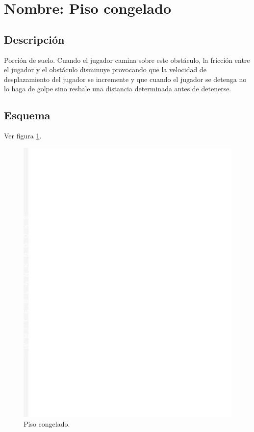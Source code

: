 	\section{Nombre: Piso congelado}\label{obs.pisoC}
	\subsection{Descripción}
	Porción de suelo. Cuando el jugador camina sobre este obstáculo, la fricción entre el jugador y el obstáculo disminuye provocando que la velocidad de desplazamiento del jugador se incremente y que cuando el jugador se detenga no lo haga de golpe sino resbale una distancia determinada antes de detenerse.
	\subsection{Esquema}
	Ver figura \ref{fig:pisoC}.
	\begin{figure}
		\centering
		\includegraphics[height=0.2 \textheight]{Imagenes/pisoC}
		\caption{Piso congelado.}
		\label{fig:pisoC}
	\end{figure}